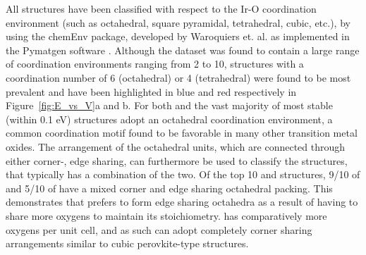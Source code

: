 %
All structures have been classified with respect to the Ir-O coordination environment (such as octahedral, square pyramidal, tetrahedral, cubic, etc.),
by using the chemEnv package, developed by Waroquiers et. al. \cite{Waroquiers2017} as implemented in the Pymatgen software \cite{Ong2013}.
%
Although the dataset was found to contain a large range of coordination environments ranging from 2 to 10,
structures with a coordination number of 6 (octahedral) or 4 (tetrahedral) were found to be most prevalent
and have been highlighted in blue and red respectively in Figure~\ref{fig:E_vs_V}a and b.
%
For both \IrOtwo and \IrOthree the vast majority of most stable (within 0.1 eV) structures adopt an octahedral coordination environment, a common coordination motif found to be favorable in many other transition metal oxides.\cite{Waroquiers2017}
%
The arrangement of the octahedral units, which are connected through either corner-, edge sharing,
can furthermore be used to classify the structures, that typically has a combination of the two.
%
Of the top 10 \IrOtwo and \IrOthree structures, 9/10 of \IrOtwo and 5/10 of \IrOthree have a mixed corner and edge sharing octahedral packing.
%
This demonstrates that \IrOtwo prefers to form edge sharing octahedra as a result of having to share more oxygens to maintain its stoichiometry.
%
\IrOthree has comparatively more oxygens per unit cell, and as such can adopt completely corner sharing arrangements similar to cubic perovkite-type structures.

